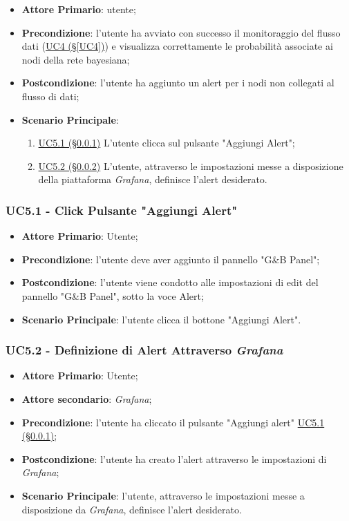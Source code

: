 \begin{itemize}
	\item \textbf{Attore Primario}: utente;
	\item \textbf{Precondizione}:
	l'utente ha avviato con successo il monitoraggio del flusso dati (\hyperref[UC4]				{UC4 (§\ref*{UC4})}) e visualizza correttamente le probabilità associate ai nodi della rete bayesiana;
	\item \textbf{Postcondizione}: l'utente ha aggiunto un alert per i nodi non collegati al flusso di dati;
	\item \textbf{Scenario Principale}:
	\begin{enumerate}
		\item \hyperref[UC5.1]{UC5.1 (§\ref*{UC5.1})}  L'utente clicca sul pulsante "Aggiungi Alert";
		\item \hyperref[UC5.2]{UC5.2 (§\ref*{UC5.2})} L'utente, attraverso le impostazioni messe a disposizione della piattaforma \textit{Grafana}, definisce l'alert desiderato.
	\end{enumerate}
	
\end{itemize}

\subsubsection{UC5.1 - Click Pulsante "Aggiungi Alert"}\label{UC5.1}
\begin{itemize}
	\item \textbf{Attore Primario}: Utente;
	\item \textbf{Precondizione}: l'utente deve aver aggiunto il pannello "G\&B Panel";
	\item \textbf{Postcondizione}: l'utente viene condotto alle impostazioni di edit del pannello 
	"G\&B Panel", sotto la voce Alert;
	\item \textbf{Scenario Principale}: l'utente clicca il bottone "Aggiungi Alert".
\end{itemize}

\subsubsection{UC5.2 - Definizione di Alert Attraverso \textit{Grafana}}\label{UC5.2}
\begin{itemize}
	\item \textbf{Attore Primario}: Utente;
	\item \textbf{Attore secondario}: \textit{Grafana};
	\item \textbf{Precondizione}: l'utente ha cliccato il pulsante "Aggiungi alert" \hyperref[UC5.1]{UC5.1 (§\ref*{UC5.1})};
	\item \textbf{Postcondizione}: l'utente ha creato l'alert attraverso le impostazioni di \textit{Grafana};
	\item \textbf{Scenario Principale}: l'utente, attraverso le impostazioni messe a disposizione da \textit{Grafana}, definisce l'alert desiderato.
\end{itemize}

